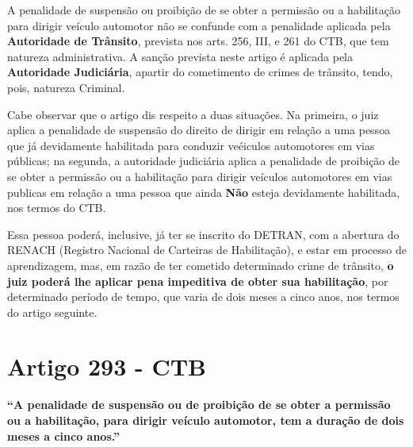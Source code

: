 \documentclass[
  letterpaper,
  DIV=11,
  numbers=noendperiod]{scrreport}
\begin{document}
A penalidade de suspensão ou proibição de se obter a permissão ou a
habilitação para dirigir veículo automotor não se confunde com a
penalidade aplicada pela \textbf{Autoridade de Trânsito}, prevista nos
arts. 256, III, e 261 do CTB, que tem natureza administrativa. A sanção
prevista neste artigo é aplicada pela \textbf{Autoridade Judiciária},
apartir do cometimento de crimes de trânsito, tendo, pois, natureza
Criminal.

Cabe observar que o artigo dis respeito a duas situações. Na primeira, o
juiz aplica a penalidade de suspensão do direito de dirigir em relação a
uma pessoa que já devidamente habilitada para conduzir veéiculos
automotores em vias públicas; na segunda, a autoridade judiciária aplica
a penalidade de proibição de se obter a permissão ou a habilitação para
dirigir veículos automotores em vias publicas em relação a uma pessoa
que ainda \textbf{Não} esteja devidamente habilitada, nos termos do CTB.

Essa pessoa poderá, inclusive, já ter se inscrito do DETRAN, com a
abertura do RENACH (Registro Nacional de Carteiras de Habilitação), e
estar em processo de aprendizagem, mas, em razão de ter cometido
determinado crime de trânsito, \textbf{o juiz poderá lhe aplicar pena
impeditiva de obter sua habilitação}, por determinado período de tempo,
que varia de dois meses a cinco anos, nos termos do artigo seguinte.

\hypertarget{artigo-293---ctb}{%
\section{\texorpdfstring{\textbf{Artigo 293 -
CTB}}{Artigo 293 - CTB}}\label{artigo-293---ctb}}

\begin{tcolorbox}[enhanced jigsaw, titlerule=0mm, colframe=quarto-callout-important-color-frame, opacityback=0, breakable, colbacktitle=quarto-callout-important-color!10!white, left=2mm, bottomtitle=1mm, toprule=.15mm, rightrule=.15mm, arc=.35mm, leftrule=.75mm, bottomrule=.15mm, opacitybacktitle=0.6, toptitle=1mm, title=\textcolor{quarto-callout-important-color}{\faExclamation}\hspace{0.5em}{Important}, colback=white, coltitle=black]

\textbf{``A penalidade de suspensão ou de proibição de se obter a
permissão ou a habilitação, para dirigir veículo automotor, tem a
duração de dois meses a cinco anos.''}

\end{tcolorbox}
\end{document}
